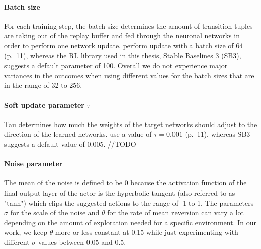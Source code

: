 \paragraph{Batch size} For each training step, the batch size determines the amount of transition tuples are taking out of the replay buffer and fed through the neuronal networks in order to perform one network update. \cite{lillicrap2019continuous} perform update with a batch size of 64 (p.~11), whereas the RL library used in this thesis, Stable Baselines 3 (SB3), suggests a default parameter of 100. Overall we do not experience major variances in the outcomes when using different values for the batch sizes that are in the range of 32 to 256. 

\paragraph{Soft update parameter $\tau$} Tau determines how much the weights of the target networks should adjust to the direction of the learned networks. \cite{lillicrap2019continuous} use a value of $\tau = 0.001$ (p.~11), whereas SB3 suggests a default value of 0.005. //TODO

\paragraph{Noise parameter} The mean of the noise is defined to be 0 because the activation function of the final output layer of the actor is the hyperbolic tangent (also referred to as "tanh") which clips the suggested actions to the range of -1 to 1. The parameters $\sigma$ for the scale of the noise and $\theta$ for the rate of mean reversion can vary a lot depending on the amount of exploration needed for a specific environment. In our work, we keep $\theta$ more or less constant at 0.15 while just experimenting with different $\sigma$ values between 0.05 and 0.5. 